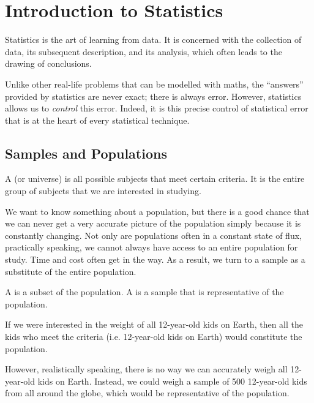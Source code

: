 \chapter{Introduction to Statistics}\label{chap:Intro-To-Stats}

Statistics is the art of learning from data. It is concerned with the collection of data, its subsequent description, and its analysis, which often leads to the drawing of conclusions. 

Unlike other real-life problems that can be modelled with maths, the ``answers'' provided by statistics are never exact; there is always error. However, statistics allows us to \emph{control} this error. Indeed, it is this precise control of statistical error that is at the heart of every statistical technique.

\section{Samples and Populations}

\begin{definition}
    A  (or universe) is all possible subjects that meet certain criteria. It is the entire group of subjects that we are interested in studying.
\end{definition}

We want to know something about a population, but there is a good chance that we can never get a very accurate picture of the population simply because it is constantly changing. Not only are populations often in a constant state of flux, practically speaking, we cannot always have access to an entire population for study. Time and cost often get in the way. As a result, we turn to a sample as a substitute of the entire population.

\begin{definition}
    A  is a subset of the population. A  is a sample that is representative of the population.
\end{definition}

\begin{example}
    If we were interested in the weight of all 12-year-old kids on Earth, then all the kids who meet the criteria (i.e. 12-year-old kids on Earth) would constitute the population.

    However, realistically speaking, there is no way we can accurately weigh all 12-year-old kids on Earth. Instead, we could weigh a sample of 500 12-year-old kids from all around the globe, which would be representative of the population.
\end{example}

